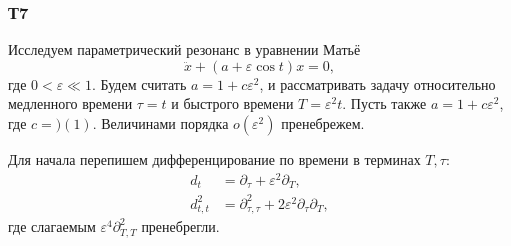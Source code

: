 \subsubsection*{Т7}


Исследуем параметрический резонанс в уравнении Матьё
\begin{equation*}
    \ddot{x} + (a + \varepsilon \cos t) x = 0,
\end{equation*}
где $0 < \varepsilon \ll 1$. Будем считать $a = 1 + c \varepsilon^2$, и рассматривать задачу относительно медленного времени $\tau = t$ и быстрого времени $T = \varepsilon^2 t$. Пусть также $a = 1 + c \varepsilon^2$, где $c = )(1)$. Величинами порядка $o(\varepsilon^2)$ пренебрежем.

Для начала перепишем дифференцирование по времени в терминах $T, \tau$:
\begin{align*}
    d_t &= \partial_\tau + \varepsilon^2 \partial_T, \\
    d^2_{t, t} &= 
    \partial^2_{\tau, \tau} + 2 \varepsilon^2 \partial_\tau \partial_T,
\end{align*}
где слагаемым $\varepsilon^4 \partial^2_{T, T}$ пренебрегли. 

